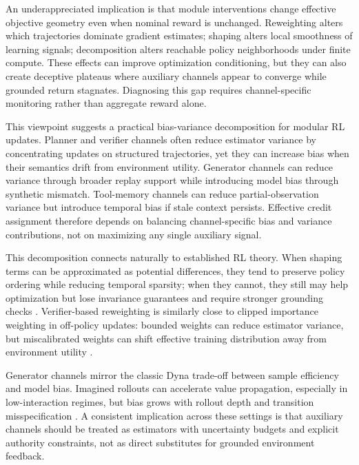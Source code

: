 \documentclass[pdflatex,sn-mathphys-num]{sn-jnl}
\begin{document}
An underappreciated implication is that module interventions change effective objective geometry even when nominal reward is unchanged. Reweighting alters which trajectories dominate gradient estimates; shaping alters local smoothness of learning signals; decomposition alters reachable policy neighborhoods under finite compute. These effects can improve optimization conditioning, but they can also create deceptive plateaus where auxiliary channels appear to converge while grounded return stagnates. Diagnosing this gap requires channel-specific monitoring rather than aggregate reward alone.

This viewpoint suggests a practical bias-variance decomposition for modular RL updates. Planner and verifier channels often reduce estimator variance by concentrating updates on structured trajectories, yet they can increase bias when their semantics drift from environment utility. Generator channels can reduce variance through broader replay support while introducing model bias through synthetic mismatch. Tool-memory channels can reduce partial-observation variance but introduce temporal bias if stale context persists. Effective credit assignment therefore depends on balancing channel-specific bias and variance contributions, not on maximizing any single auxiliary signal.

This decomposition connects naturally to established RL theory. When shaping terms can be approximated as potential differences, they tend to preserve policy ordering while reducing temporal sparsity; when they cannot, they still may help optimization but lose invariance guarantees and require stronger grounding checks \cite{arxiv_p_2310_12931,arxiv_p_2309_11489,arxiv_p_2309_06687}. Verifier-based reweighting is similarly close to clipped importance weighting in off-policy updates: bounded weights can reduce estimator variance, but miscalibrated weights can shift effective training distribution away from environment utility \cite{arxiv_p_2602_06493,arxiv_p_2602_12579,arxiv_p_2602_02395}.

Generator channels mirror the classic Dyna trade-off between sample efficiency and model bias. Imagined rollouts can accelerate value propagation, especially in low-interaction regimes, but bias grows with rollout depth and transition misspecification \cite{arxiv_p_2301_12050,arxiv_p_2602_02454,arxiv_p_2602_11075,arxiv_p_2602_12099}. A consistent implication across these settings is that auxiliary channels should be treated as estimators with uncertainty budgets and explicit authority constraints, not as direct substitutes for grounded environment feedback.
\end{document}
